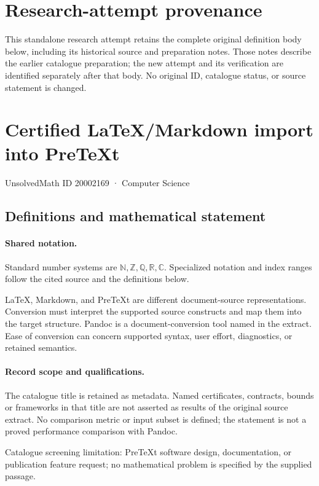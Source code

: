 \documentclass[11pt]{article}
\begin{document}
\section*{Research-attempt provenance}
This standalone research attempt retains the complete original definition body below,
including its historical source and preparation notes. Those notes describe the
earlier catalogue preparation; the new attempt and its verification are identified
separately after that body. No original ID, catalogue status, or source statement is changed.

\section{Certified LaTeX/Markdown import into PreTeXt}\label{20002169}
{\small UnsolvedMath ID 20002169 · Computer Science}
\subsection{Definitions and mathematical statement}

\paragraph{Shared notation.}Standard number systems are $\mathbb N,\mathbb Z,\mathbb Q,\mathbb R,\mathbb C$. Specialized notation and index ranges follow the cited source and the definitions below.


LaTeX, Markdown, and PreTeXt are different document-source representations. Conversion must interpret the supported source constructs and map them into the target structure. Pandoc is a document-conversion tool named in the extract. Ease of conversion can concern supported syntax, user effort, diagnostics, or retained semantics.
\paragraph{Record scope and qualifications.}
The catalogue title is retained as metadata. Named certificates, contracts, bounds or frameworks in that title are not asserted as results of the original source extract.
No comparison metric or input subset is defined; the statement is not a proved performance comparison with Pandoc.

Catalogue screening limitation: PreTeXt software design, documentation, or publication feature request; no mathematical problem is specified by the supplied passage.
\end{document}
